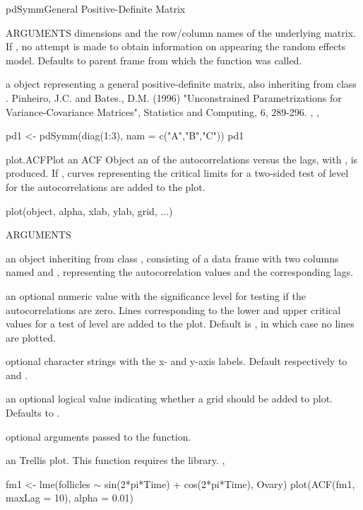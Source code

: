 \documentclass[pdftex]{article} \usepackage{url,graphicx}
\renewcommand{\Twiddle}{\mbox{\(\sim\)}}
\begin{document}
\begin{Helpfile}{pdSymm}{General Positive-Definite Matrix}
\begin{Argument}{ARGUMENTS}
dimensions and the row/column names of the underlying matrix. If
, no attempt is made to obtain information on 
 appearing the random effects model. Defaults to parent
frame from which the function was called.
\end{Argument}
a  object representing a general positive-definite
matrix, also inheriting from class .
Pinheiro, J.C. and Bates., D.M.  (1996) "Unconstrained
Parametrizations for Variance-Covariance Matrices", Statistics and
Computing, 6, 289-296.
, ,
\need 15pt
\vspace{-16pt} 
\begin{Example}
pd1 <- pdSymm(diag(1:3), nam = c("A","B","C"))
pd1
\end{Example}
\end{Helpfile}
\begin{Helpfile}{plot.ACF}{Plot an ACF Object}
an  of the autocorrelations versus the lags, with
, is produced. If , curves
representing the critical limits for a two-sided test of level
 for the autocorrelations are added to the plot.
\begin{Example}
plot(object, alpha, xlab, ylab, grid, ...)
\end{Example}
\begin{Argument}{ARGUMENTS}
\item[\Co{object:}]
an object inheriting from class ,
consisting of a data frame with two columns named  and
, representing the autocorrelation values and the
corresponding lags. 
\item[\Co{alpha:}]
an optional numeric value with the significance level for
testing if the autocorrelations are zero. Lines corresponding to the
lower and upper critical values for a test of level  are
added to the plot. Default is , in which case no lines are
plotted.
\item[\Co{xlab,ylab:}]
optional character strings with the x- and y-axis
labels. Default respectively to  and 
. 
\item[\Co{grid:}]
an optional logical value indicating whether a grid should
be added to plot. Defaults to .
\item[\Co{...:}]
optional arguments passed to the  function.
\end{Argument}
an  Trellis plot.
This function requires the  library.
, 
\need 15pt
\vspace{-16pt}
\begin{Example}
fm1 <- lme(follicles {\Twiddle} sin(2*pi*Time) + cos(2*pi*Time), Ovary)
plot(ACF(fm1, maxLag = 10), alpha = 0.01)
\end{Example}
\end{Helpfile}
\end{document}
